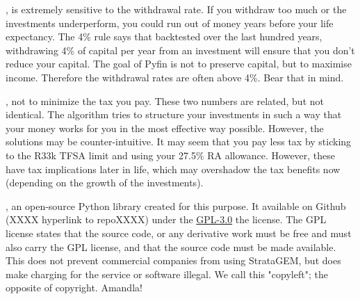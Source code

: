 \documentclass[a4paper, justified]{tufte-handout}
\begin{document}
, is extremely sensitive to the withdrawal rate. If you withdraw too much or the investments underperform, you could run out of money years before your life expectancy. The 4\% rule says that backtested over the last hundred years, withdrawing 4\% of capital per year from an investment will ensure that you don't reduce your capital. The goal of Pyfin is not to preserve capital, but to maximise income. Therefore the withdrawal rates are often above 4\%. Bear that in mind.

, not to minimize the tax you pay. These two numbers are related, but not identical. The algorithm tries to structure your investments in such a way that your money works for you in the most effective way possible. However, the solutions may be counter-intuitive. It may seem that you pay less tax by sticking to the R33k TFSA limit and using your 27.5\% RA allowance. However, these have tax implications later in life, which may overshadow the tax benefits now (depending on the growth of the investments). 

, an open-source Python library created for this purpose. It available on Github (XXXX hyperlink to repoXXXX) under the \href{https://opensource.org/licenses/GPL-3.0}{GPL-3.0} the license. The GPL license states that the source code, or any derivative work must be free and must also carry the GPL license, and that the source code must be made available. This does not prevent commercial companies from using StrataGEM, but does make charging for the service or software illegal. We call this "copyleft"; the opposite of copyright. Amandla!
\end{document}
